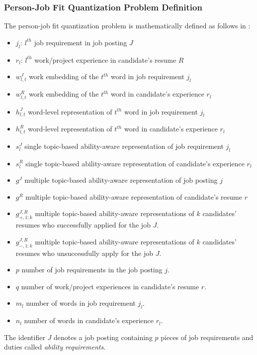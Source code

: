 \documentclass[draft,final]{thesisclass} %
\begin{document}
\subsubsection{Person-Job Fit Quantization Problem Definition}
The person-job fit quantization problem is mathematically defined as follows in \textcite[7-8]{pj_fit_ml}:
\begin{itemize}
    \item $j_l$: $l^{th}$ job requirement in job posting $J$
    \item $r_l$: $l^{th}$ work/project experience in candidate's resume $R$
    \item $w^J_{l,t}$ work embedding of the $t^{th}$ word in job requirement $j_l$
    \item $w^R_{l,t}$ work embedding of the $t^{th}$ word in candidate's experience $r_l$
    \item $h^J_{l,t}$ word-level representation of $t^{th}$ word in job requirement $j_l$
    \item $h^R_{l,t}$ word-level representation of $t^{th}$ word in candidate's experience $r_l$
    \item $s^J_l$ single topic-based ability-aware representation of job requirement $j_l$
    \item $s^R_l$ single topic-based ability-aware representation of candidate's experience $r_l$
    \item $g^J$ multiple topic-based ability-aware representation of job posting $j$
    \item $g^R$ multiple topic-based ability-aware representation of candidate's resume $r$
    \item $g^{J,R}_{+,1:k}$ multiple topic-based ability-aware representations of $k$ candidates' resumes who successfully applied for the job $J$.
    \item $g^{J,R}_{-,1:k}$ multiple topic-based ability-aware representations of $k$ candidates' resumes who unsuccessfully apply for the job $J$.
    \item $p$ number of job requirements in the job posting $j$.
    \item $q$ number of work/project experiences in candidate's resume $r$.
    \item $m_l$ number of words in job requirement $j_l$.
    \item $n_l$ number of words in candidate's experience $r_l$.
\end{itemize}
The identifier $J$ denotes a job posting containing $p$ pieces of job requirements and duties called \textit{ability requirements}.
\end{document}
